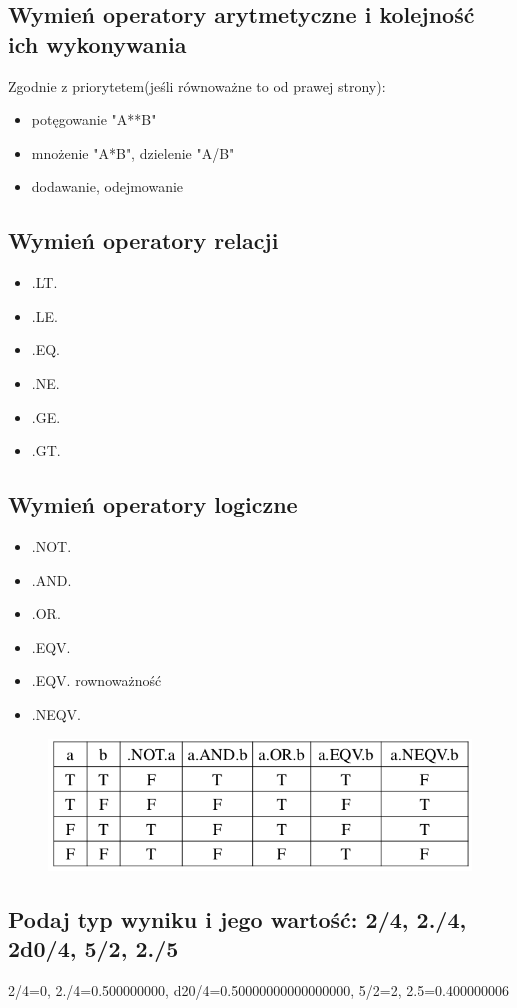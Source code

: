 \subsection{Wymień operatory arytmetyczne i kolejność ich wykonywania}
Zgodnie z priorytetem(jeśli równoważne to od prawej strony):
\begin{itemize}
\item potęgowanie "A**B"
\item mnożenie "A*B", dzielenie "A/B"
\item dodawanie, odejmowanie
\end{itemize}
\subsection{Wymień operatory relacji}
\begin{itemize}
\item .LT.
\item .LE.
\item .EQ.
\item .NE.
\item .GE.
\item .GT.
\end{itemize}
\subsection{Wymień operatory logiczne}
\begin{itemize}
\item .NOT.
\item .AND.
\item .OR.
\item .EQV.
\item .EQV. rownoważność
\item .NEQV.
\end{itemize}
\begin{figure}[h!]
\centering
\includegraphics[scale=0.4]{oplog}
\end{figure}
\subsection{Podaj typ wyniku i jego wartość: 2/4, 2./4, 2d0/4, 5/2, 2./5}
2/4=0, 2./4=0.500000000, d20/4=0.50000000000000000, 5/2=2, 2.5=0.400000006


